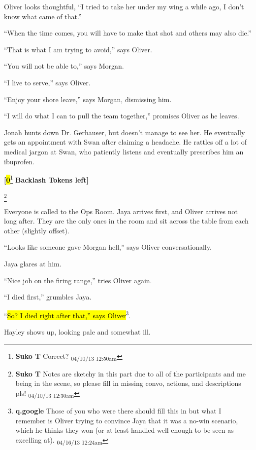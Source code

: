 Oliver looks thoughtful, ``I tried to take her under my wing a while ago, I don't know what came of that.''

``When the time comes, you will have to make that shot and others may also die.''

``That is what I am trying to avoid,'' says Oliver.

``You will not be able to,'' says Morgan.

``I live to serve,'' says Oliver.

``Enjoy your shore leave,'' says Morgan, dismissing him.

``I will do what I can to pull the team together,'' promises Oliver as he leaves.



Jonah hunts down Dr. Gerhauser, but doesn't manage to see her.  He eventually gets an appointment with Swan after claiming a headache.  He rattles off a lot of medical jargon at Swan, who patiently listens and eventually prescribes him an ibuprofen.



\textbf{{[}}\textbf{\hl{0}}\footnote{\textbf{Suko T }Correct? \textsubscript{04/10/13 12:50am}}\textbf{ Backlash Tokens left{]}}


\footnote{\textbf{Suko T }Notes are sketchy in this part due to all of the participants and me being in the scene, so please fill in missing convo, actions, and descriptions pls! \textsubscript{04/10/13 12:30am}}

Everyone is called to the Ops Room.  Jaya arrives first, and Oliver arrives not long after.  They are the only ones in the room and sit across the table from each other (slightly offset).

``Looks like someone gave Morgan hell,'' says Oliver conversationally.

Jaya glares at him.

``Nice job on the firing range,'' tries Oliver again.

``I died first,'' grumbles Jaya.

``\hl{So? I died right after that,'' says Oliver}\footnote{\textbf{q.google }Those of you who were there should fill this in but what I remember is Oliver trying to convince Jaya that it was a no-win scenario, which he thinks they won (or at least handled well enough to be seen as excelling at). \textsubscript{04/16/13 12:24am}}.



Hayley shows up, looking pale and somewhat ill.

